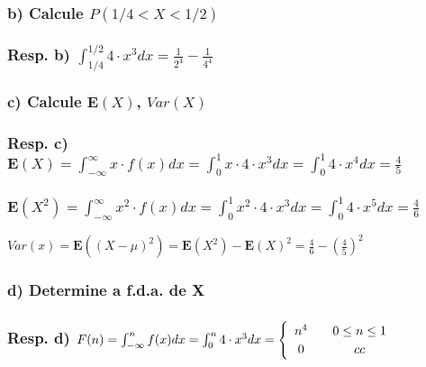 \documentclass[portuguese]{article}
\begin{document}
\subsubsection*{\textmd{b) Calcule $P(1/4<X<1/2)$}}


\subsubsection*{\textmd{Resp. b) $\int_{1/4}^{1/2}4\cdot x^{3}dx=\frac{1}{2^{4}}-\frac{1}{4^{4}}$}}


\subsubsection*{\textmd{c) Calcule $\mathbf{E}(X)$, $Var(X)$}}


\subsubsection*{\textmd{Resp. c) $\mathbf{E}(X)=\int_{-\infty}^{\infty}x\cdot f(x)dx=\int_{0}^{1}x\cdot4\cdot x^{3}dx=\int_{0}^{1}4\cdot x^{4}dx=\frac{4}{5}$}}


\subsubsection*{\textmd{$\mathbf{E}(X^{2})=\int_{-\infty}^{\infty}x{}^{2}\cdot f(x)dx=\int_{0}^{1}x^{2}\cdot4\cdot x^{3}dx=\int_{0}^{1}4\cdot x^{5}dx=\frac{4}{6}$}}

\textbf{$Var(x)=\mathbf{E}((X-\mu)^{2})=\mathbf{E}(X^{2})-\mathbf{E}(X)^{2}=\frac{4}{6}-(\frac{4}{5})^{2}$}


\subsubsection*{\textmd{d) Determine a f.d.a. de X}}


\subsubsection*{\textmd{Resp. d) $F(n)=\int_{-\infty}^{n}f(x)dx=\int_{0}^{n}4\cdot x^{3}dx=\protect\begin{cases}
\protect\begin{array}{c}
n^{4}\protect\\
0
\protect\end{array} & \protect\begin{array}{c}
0\leq n\leq1\protect\\
cc
\protect\end{array}\protect\end{cases}$}}
\end{document}
